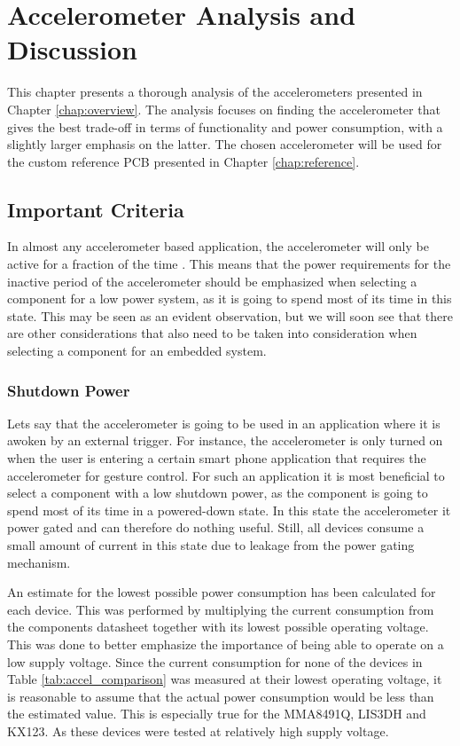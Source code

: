 \chapter{Accelerometer Analysis and Discussion}
\label{chap:analysis}

This chapter presents a thorough analysis of the accelerometers presented in Chapter \ref{chap:overview}. The analysis focuses on finding the accelerometer that gives the best trade-off in terms of functionality and power consumption, with a slightly larger emphasis on the latter. The chosen accelerometer will be used for the custom reference PCB presented in Chapter \ref{chap:reference}.

\section{Important Criteria}

In almost any accelerometer based application, the accelerometer will only be active for a fraction of the time \cite{moldsvor15}. This means that the power requirements for the inactive period of the accelerometer should be emphasized when selecting a component for a low power system, as it is going to spend most of its time in this state. This may be seen as an evident observation, but we will soon see that there are other considerations that also need to be taken into consideration when selecting a component for an embedded system.

\subsection{Shutdown Power}

Lets say that the accelerometer is going to be used in an application where it is awoken by an external trigger. For instance, the accelerometer is only turned on when the user is entering a certain smart phone application that requires the accelerometer for gesture control. For such an application it is most beneficial to select a component with a low shutdown power, as the component is going to spend most of its time in a powered-down state. In this state the accelerometer it power gated and can therefore do nothing useful. Still, all devices consume a small amount of current in this state due to leakage from the power gating mechanism.   

An estimate for the lowest possible power consumption has been calculated for each device. This was performed by multiplying the current consumption from the components datasheet together with its lowest possible operating voltage. This was done to better emphasize the importance of being able to operate on a low supply voltage. Since the current consumption for none of the devices in Table \ref{tab:accel_comparison} was measured at their lowest operating voltage, it is reasonable to assume that the actual power consumption would be less than the estimated value. This is especially true for the MMA8491Q, LIS3DH and KX123. As these devices were tested at relatively high supply voltage. 

